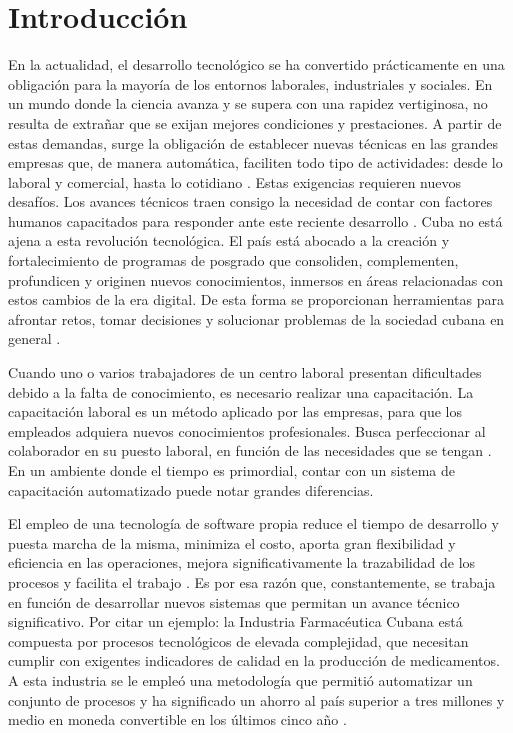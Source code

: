 \chapter*{Introducción}
En la actualidad, el desarrollo tecnológico se ha convertido prácticamente en una obligación para la mayoría de los entornos laborales, industriales y sociales. En un mundo donde la ciencia avanza y se supera con una rapidez vertiginosa, no resulta de extrañar que se exijan mejores condiciones y prestaciones. A partir de estas demandas, surge la obligación de establecer nuevas técnicas en las grandes empresas que, de manera automática, faciliten todo tipo de actividades: desde lo laboral y comercial, hasta lo cotidiano \cite{avanceTecnologico}. 
Estas exigencias requieren nuevos desafíos. Los avances técnicos traen consigo la necesidad de contar con factores humanos capacitados para responder ante este reciente desarrollo \cite{invstCibernCuba}. 
Cuba no está ajena a esta revolución tecnológica. El país está abocado a la creación y fortalecimiento de programas de posgrado que consoliden, complementen, profundicen y originen nuevos conocimientos, inmersos en áreas relacionadas con estos cambios de la era digital. De esta forma se proporcionan herramientas para afrontar retos, tomar decisiones y solucionar problemas de la sociedad cubana en general \cite{avanceTecnologico}.

Cuando uno o varios trabajadores de un centro laboral presentan dificultades debido a la falta de conocimiento, es necesario realizar una capacitación. La capacitación laboral es un método aplicado por las empresas, para que los empleados adquiera nuevos conocimientos profesionales. Busca perfeccionar al colaborador en su puesto laboral, en función de las necesidades que se tengan \cite{Denby2010}. En un ambiente donde el tiempo es primordial, contar con un sistema de capacitación automatizado puede notar grandes diferencias.

El empleo de una tecnología de software propia reduce el tiempo de desarrollo y puesta marcha de la misma, minimiza el costo, aporta gran flexibilidad y eficiencia en las operaciones, mejora significativamente la trazabilidad de los procesos y facilita el trabajo \cite{industriaCubana}.
Es por esa razón que, constantemente, se trabaja en función de desarrollar nuevos sistemas que permitan un avance técnico significativo.
Por citar un ejemplo: la Industria Farmacéutica Cubana está compuesta por procesos tecnológicos de elevada complejidad, que necesitan cumplir con exigentes indicadores de calidad en la producción de medicamentos. A esta industria se le empleó una metodología que permitió automatizar un conjunto de procesos y ha significado un ahorro al país superior a tres millones y medio en moneda convertible en los últimos cinco año \cite{industriaFarmceutica}.

